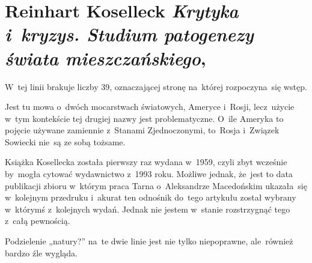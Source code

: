 \documentclass[a4paper,11pt]{article}
\numberwithin{equation}{section}
\begin{document}



\section{Reinhart Koselleck \textit{Krytyka i~kryzys.
    Studium patogenezy świata mieszczańskiego},
  \parencite{KoselleckKrytykaIKryzys2015}}

\vspace{0em}



\vspace{0em}


\noindent
{} W~tej linii brakuje liczby 39, oznaczającej stronę
na~której rozpoczyna~się wstęp.

\VerSpaceFour





\noindent
{} Jest tu mowa o~dwóch mocarstwach światowych, Ameryce
i~Rosji, lecz~użycie w~tym kontekście tej drugiej nazwy jest
problematyczne. O~ile Ameryka to pojęcie używane zamiennie z~Stanami
Zjednoczonymi, to~Rosja i~Związek Sowiecki nie~są ze sobą tożsame.

\VerSpaceFour





\noindent
{} Książka Kosellecka została pierwszy raz wydana
w~1959, czyli zbyt wcześnie by~mogła cytować wydawnictwo z~1993 roku.
Możliwe jednak, że~jest to data publikacji zbioru w~którym praca Tarna
o~Aleksandrze Macedońskim ukazała~się w~kolejnym przedruku i~akurat
ten odnośnik do~tego artykułu został wybrany w~którymś z~kolejnych
wydań. Jednak nie jestem w~stanie rozstrzygnąć tego z~całą pewnością.

\VerSpaceFour





\noindent
{} Podzielenie „natury?” na~te dwie linie jest nie
tylko
niepoprawne, ale~również bardzo źle wygląda.

\VerSpaceFour





\end{document}
